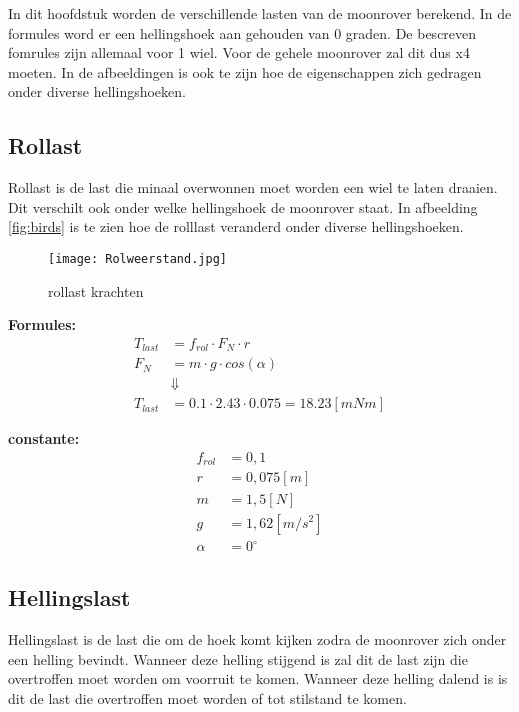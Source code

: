 In dit hoofdstuk worden de verschillende lasten van de moonrover berekend. In de formules word er een hellingshoek aan gehouden van 0 graden. De bescreven fomrules zijn allemaal voor 1 wiel. Voor de gehele moonrover zal dit dus x4 moeten. In de afbeeldingen is ook te zijn hoe de eigenschappen zich gedragen onder diverse hellingshoeken.

\subsection{Rollast}
    Rollast is de last die minaal overwonnen moet worden een wiel te laten draaien. Dit verschilt ook onder welke hellingshoek de moonrover staat. In afbeelding \ref{fig:birds} is te zien hoe de rolllast veranderd onder diverse hellingshoeken.

    \begin{figure}[H]
        \centering
        \texttt{[image: Rolweerstand.jpg]}
        \caption{rollast krachten}
    \end{figure}

    \begin{multicols}{2}
        \textbf{Formules:}
        \begin{equation}
            \begin{split}
                T_{last} &= f_{rol} \cdot F_{N} \cdot r \\
                F_{N} &= m \cdot g \cdot cos(\alpha) \\
                &\Downarrow \\
                T_{last} &= 0.1 \cdot 2.43 \cdot 0.075 = 18.23 [mNm]
            \end{split}
        \end{equation}

        \textbf{constante:}
        \begin{equation*}
            \begin{split}
                f_{rol} &= 0,1 \\
                r &= 0,075 [m] \\
                m &= 1,5 [N] \\
                g &= 1,62 [m/s^2] \\
                \alpha &= 0^\circ
            \end{split}
        \end{equation*}
    \end{multicols}

\subsection{Hellingslast}
    Hellingslast is de last die om de hoek komt kijken zodra de moonrover zich onder een helling bevindt. Wanneer deze helling stijgend is zal dit de last zijn die overtroffen moet worden om voorruit te komen. Wanneer deze helling dalend is is dit de last die overtroffen moet worden of tot stilstand te komen.

